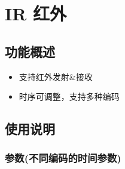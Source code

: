 \documentclass[
  12pt,
]{book}
\providecommand{\tightlist}{%
  \setlength{\itemsep}{0pt}\setlength{\parskip}{0pt}}
\begin{document}
\hypertarget{ir-ux7ea2ux5916}{%
\chapter{IR 红外}\label{ir-ux7ea2ux5916}}

\hypertarget{ux529fux80fdux6982ux8ff0-2}{%
\section{功能概述}\label{ux529fux80fdux6982ux8ff0-2}}

\begin{itemize}
\tightlist
\item
  支持红外发射\&接收
\item
  时序可调整，支持多种编码
\end{itemize}

\hypertarget{ux4f7fux7528ux8bf4ux660e-2}{%
\section{使用说明}\label{ux4f7fux7528ux8bf4ux660e-2}}

\hypertarget{ux53c2ux6570ux4e0dux540cux7f16ux7801ux7684ux65f6ux95f4ux53c2ux6570}{%
\subsection{参数(不同编码的时间参数)}\label{ux53c2ux6570ux4e0dux540cux7f16ux7801ux7684ux65f6ux95f4ux53c2ux6570}}
\end{document}
